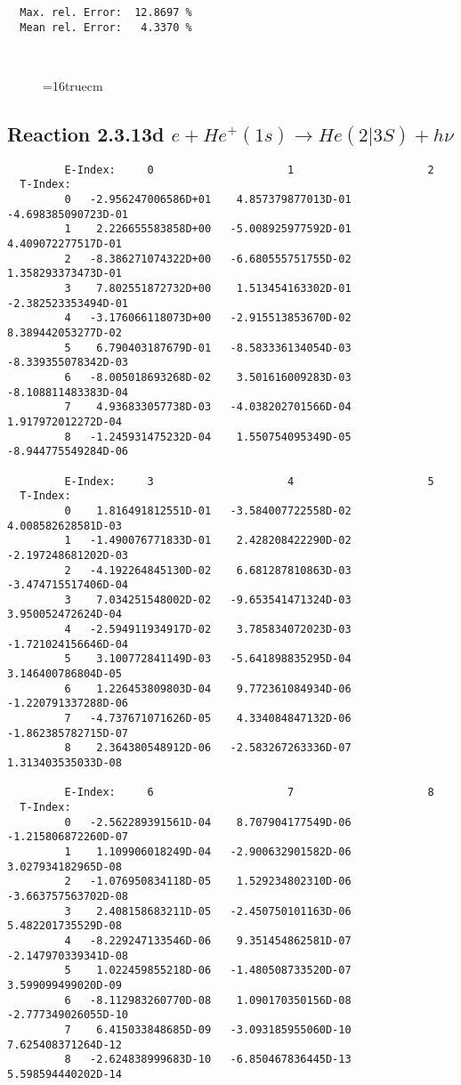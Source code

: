 \documentclass[12pt]{article}
\begin{document}
\begin{small}
\begin{verbatim}
  Max. rel. Error:  12.8697 %
  Mean rel. Error:   4.3370 %



\end{verbatim}\end{small}
\begin{figure} \label{2.3.13c}
\epsfxsize=16truecm
\end{figure}
\newpage

\subsection{
Reaction 2.3.13d  $e + He^+(1s) \rightarrow He(2|3S) + h\nu $
}


\begin{small}\begin{verbatim}
         E-Index:     0                     1                     2
  T-Index:
         0   -2.956247006586D+01    4.857379877013D-01   -4.698385090723D-01
         1    2.226655583858D+00   -5.008925977592D-01    4.409072277517D-01
         2   -8.386271074322D+00   -6.680555751755D-02    1.358293373473D-01
         3    7.802551872732D+00    1.513454163302D-01   -2.382523353494D-01
         4   -3.176066118073D+00   -2.915513853670D-02    8.389442053277D-02
         5    6.790403187679D-01   -8.583336134054D-03   -8.339355078342D-03
         6   -8.005018693268D-02    3.501616009283D-03   -8.108811483383D-04
         7    4.936833057738D-03   -4.038202701566D-04    1.917972012272D-04
         8   -1.245931475232D-04    1.550754095349D-05   -8.944775549284D-06

         E-Index:     3                     4                     5
  T-Index:
         0    1.816491812551D-01   -3.584007722558D-02    4.008582628581D-03
         1   -1.490076771833D-01    2.428208422290D-02   -2.197248681202D-03
         2   -4.192264845130D-02    6.681287810863D-03   -3.474715517406D-04
         3    7.034251548002D-02   -9.653541471324D-03    3.950052472624D-04
         4   -2.594911934917D-02    3.785834072023D-03   -1.721024156646D-04
         5    3.100772841149D-03   -5.641898835295D-04    3.146400786804D-05
         6    1.226453809803D-04    9.772361084934D-06   -1.220791337288D-06
         7   -4.737671071626D-05    4.334084847132D-06   -1.862385782715D-07
         8    2.364380548912D-06   -2.583267263336D-07    1.313403535033D-08

         E-Index:     6                     7                     8
  T-Index:
         0   -2.562289391561D-04    8.707904177549D-06   -1.215806872260D-07
         1    1.109906018249D-04   -2.900632901582D-06    3.027934182965D-08
         2   -1.076950834118D-05    1.529234802310D-06   -3.663757563702D-08
         3    2.408158683211D-05   -2.450750101163D-06    5.482201735529D-08
         4   -8.229247133546D-06    9.351454862581D-07   -2.147970339341D-08
         5    1.022459855218D-06   -1.480508733520D-07    3.599099499020D-09
         6   -8.112983260770D-08    1.090170350156D-08   -2.777349026055D-10
         7    6.415033848685D-09   -3.093185955060D-10    7.625408371264D-12
         8   -2.624838999683D-10   -6.850467836445D-13    5.598594440202D-14


\end{verbatim}
\end{small}
\end{document}
